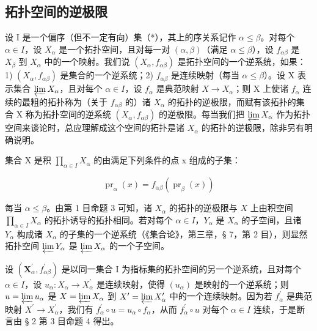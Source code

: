 \subsection{拓扑空间的逆极限}

设 I 是一个偏序（但不一定有向）集（*），其上的序关系记作 \(\alpha \leqslant \beta\)。对每个 \(\alpha \in I\)，设 \(X_{\alpha}\) 是一个拓扑空间，且对每一对 \((\alpha, \beta)\)（满足 \(\alpha \leqslant \beta\)），设 \(f_{\alpha\beta}\) 是 \(X_{\beta}\) 到 \(X_{\alpha}\) 中的一个映射。我们说 \((X_{\alpha}, f_{\alpha\beta})\) 是拓扑空间的一个逆系统，如果：1) \((X_{\alpha}, f_{\alpha\beta})\) 是集合的一个逆系统；2) \(f_{\alpha\beta}\) 是连续映射（每当 \(\alpha \leqslant \beta\)）。设 X 表示集合 \(\varprojlim X_{\alpha}\)，且对每个 \(\alpha \in I\)，设 \(f_{\alpha}\) 是典范映射 \(X \to X_{\alpha}\)；则 X 上使诸 \(f_{\alpha}\) 连续的最粗的拓扑称为（关于 \(f_{\alpha\beta}\) 的）诸 \(X_{\alpha}\) 的拓扑的逆极限，而赋有该拓扑的集合 X 称为拓扑空间的逆系统 \((X_{\alpha}, f_{\alpha\beta})\) 的逆极限。每当我们把 \(\varprojlim X_{\alpha}\) 作为拓扑空间来谈论时，总应理解成这个空间的拓扑是诸 \(X_{\alpha}\) 的拓扑的逆极限，除非另有明确说明。

集合 X 是积 \(\prod_{\alpha\in I}X_{\alpha}\) 的由满足下列条件的点 x 组成的子集：

\[
\operatorname{pr} _ {\alpha} (x) = f _ {\alpha \beta} (\operatorname{pr} _ {\beta} (x))\tag{I}
\]

每当 \(\alpha \leqslant \beta\)。由第 1 目命题 3 可知，诸 \(X_{\alpha}\) 的拓扑的逆极限与 \(X\) 上由积空间 \(\prod_{\alpha \in I} X_{\alpha}\) 的拓扑诱导的拓扑相同。若对每个 \(\alpha \in I\)，\(Y_{\alpha}\) 是 \(X_{\alpha}\) 的子空间，且诸 \(Y_{\alpha}\) 构成诸 \(X_{\alpha}\) 的子集的一个逆系统（《集合论》，第三章，§ 7，第 2 目），则显然拓扑空间 \(\varprojlim Y_{\alpha}\) 是 \(\varprojlim X_{\alpha}\) 的一个子空间。

设 \((\mathbf{X}_{\alpha}^{\prime}, f_{\alpha\beta}^{\prime})\) 是以同一集合 I 为指标集的拓扑空间的另一个逆系统，且对每个 \(\alpha \in I\)，设 \(u_{\alpha}: X_{\alpha} \to X_{\alpha}^{\prime}\) 是连续映射，使得 \((u_{\alpha})\) 是映射的一个逆系统；则 \(u = \varprojlim u_{\alpha}\) 是 \(X = \varprojlim X_{\alpha}\) 到 \(X^{\prime} = \varprojlim X_{\alpha}^{\prime}\) 中的一个连续映射。因为若 \(f_{\alpha}^{\prime}\) 是典范映射 \(X^{\prime} \to X_{\alpha}^{\prime}\)，我们有 \(f_{\alpha}^{\prime} \circ u = u_{\alpha} \circ f_{\alpha}\)，从而 \(f_{\alpha}^{\prime} \circ u\) 对每个 \(\alpha \in I\) 连续，于是断言由 § 2 第 3 目命题 4 得出。

